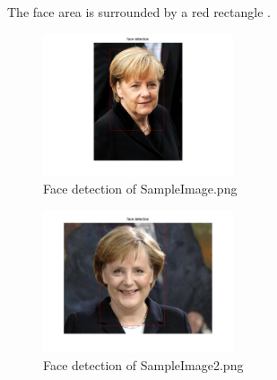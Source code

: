 \documentclass[conference]{IEEEtran}
\begin{document}
\begin{compactenum}[a)]
\newpage
\item The face area is surrounded by a red rectangle .
\begin{figure}[h!]
  	\centering
    \includegraphics[width=0.5\textwidth]{img/SampleImage-face.png}
    \caption{Face detection of SampleImage.png}
    \label{fig:face1}
\end{figure}
\begin{figure}[h!]
  	\centering
    \includegraphics[width=0.5\textwidth]{img/SampleImage2-face.png}
    \caption{Face detection of SampleImage2.png}
    \label{fig:face2}
\end{figure}

\end{compactenum}

\newpage
\end{document}
